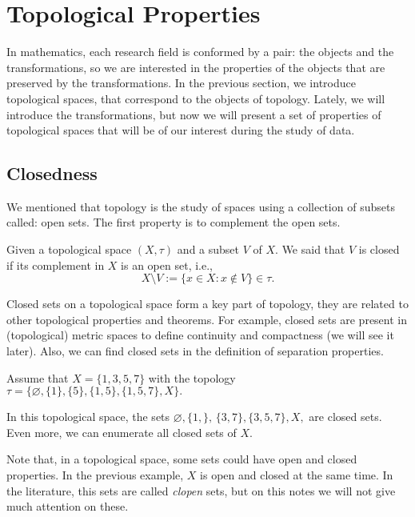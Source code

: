 \documentclass[
	fontsize=10pt, %
	twoside=false, %
	secnumdepth=1, %
]{kaobook}
\begin{document}
\section{Topological Properties}

In mathematics, each research field is conformed by a pair: the objects and the transformations, so we are interested in the properties of the objects that are preserved by the transformations. In the previous section, we introduce topological spaces, that correspond to the objects of topology. Lately, we will introduce the transformations, but now we will present a set of properties of topological spaces that will be of our interest during the study of data.


\subsection{Closedness}

We mentioned that topology is the study of spaces using a collection of subsets called: open sets. The first property is to complement the open sets. 

\begin{definition}	
Given a topological space $(X,\tau)$ and a subset $V$ of $X.$ We said that $V$ is closed if its complement in $X$ is an open set, i.e., $$X\setminus V:= \{x\in X: x\not\in V\}\in \tau.$$
\end{definition}

Closed sets on a topological space form a key part of topology, they are related to other topological properties and theorems. For example, closed sets are present in (topological) metric spaces to define continuity and compactness (we will see it later). Also, we can find closed sets in the definition of separation properties. 

\begin{example}
Assume that $X=\{1,3,5,7\}$ with the topology $\tau=\{\varnothing,\{1\},\{5\},\{1,5\},\{1,5,7\},X\}.$ 

In this topological space, the sets $\varnothing, \{1,\},\,\{3,7\},\{3,5,7\}, X,$ are closed sets. Even more, we can enumerate all closed sets of $X.$ 
 
\end{example}

Note that, in a topological space, some sets could have open and closed properties. In the previous example, $X$ is open and closed at the same time. In the literature, this sets are called \emph{clopen} sets, but on this notes we will not give much attention on these.
\end{document}
